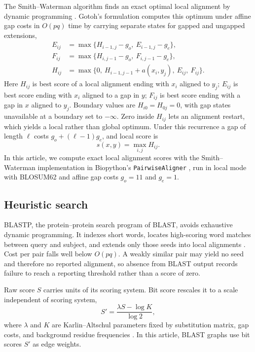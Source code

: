 \documentclass[11pt,a4paper]{article}
\begin{document}
The Smith--Waterman algorithm finds an exact optimal local alignment by dynamic programming
\citep{smith1981identification}. Gotoh's formulation computes this optimum under
affine gap costs in \(O(pq)\) time by carrying separate states for gapped and ungapped
extensions,
\begin{align*}
E_{ij}&=\max\{H_{i-1,j}-g_o,\ E_{i-1,j}-g_e\},\\
F_{ij}&=\max\{H_{i,j-1}-g_o,\ F_{i,j-1}-g_e\},\\
H_{ij}&=\max\{0,\ H_{i-1,j-1}+a(x_i,y_j),\ E_{ij},\ F_{ij}\}.
\end{align*}
Here \(H_{ij}\) is best score of a local alignment ending with \(x_i\) aligned
to \(y_j\); \(E_{ij}\) is best score ending with \(x_i\) aligned to a gap in
\(y\); \(F_{ij}\) is best score ending with a gap in \(x\) aligned to \(y_j\).
Boundary values are \(H_{i0}=H_{0j}=0\), with gap states unavailable at a
boundary set to \(-\infty\). Zero inside \(H_{ij}\) lets an alignment restart,
which yields a local rather than global optimum. Under this recurrence a gap of
length \(\ell\) costs \(g_o+(\ell-1)g_e\), and local score is
\[
s(x,y)=\max_{i,j}H_{ij}.
\]
In this article, we compute exact local alignment scores with the
Smith--Waterman implementation in Biopython's \texttt{PairwiseAligner}
\citep{cock2009biopython}, run in local mode with BLOSUM62 and affine gap costs
\(g_o=11\) and \(g_e=1\).

\subsection{Heuristic search}
\label{ssec:heuristic}

BLASTP, the protein--protein search program of BLAST, avoids exhaustive dynamic programming. It indexes short words, locates
high-scoring word matches between query and subject, and extends only those
seeds into local alignments \citep{altschul1990basic,camacho2009blastplus}.
Cost per pair falls well below \(O(pq)\). A weakly similar pair may yield no
seed and therefore no reported alignment, so absence from BLAST output records
failure to reach a reporting threshold rather than a score of zero.

Raw score \(S\) carries units of its scoring system. Bit score rescales it to a scale independent of scoring system,
\[
S'=\frac{\lambda S-\log K}{\log 2},
\]
where \(\lambda\) and \(K\) are Karlin--Altschul parameters fixed by
substitution matrix, gap costs, and background residue frequencies
\citep{karlin1990methods}. In this article, BLAST graphs use bit scores \(S'\)
as edge weights.
\end{document}
